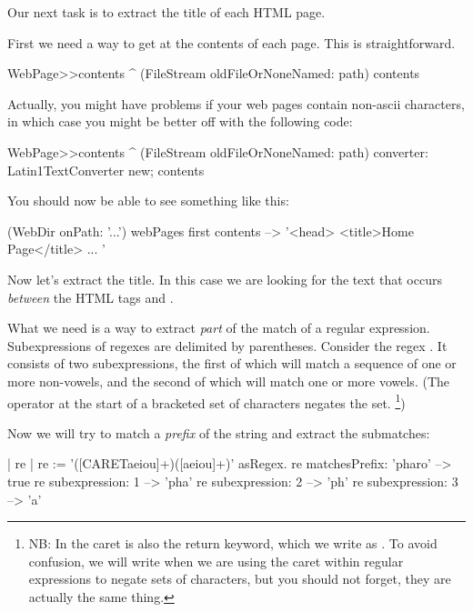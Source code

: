 \documentclass[a4paper,10pt,twoside]{book}
\begin{document}
Our next task is to extract the title of each HTML page.

First we need a way to get at the contents of each page.  This is straightforward.


\begin{code}{}
WebPage>>contents
	^ (FileStream oldFileOrNoneNamed: path) contents
\end{code}

Actually, you might have problems if your web pages contain non-ascii characters, in which case you might be better off with the following code:

\begin{code}{}
WebPage>>contents
	^ (FileStream oldFileOrNoneNamed: path)
		converter: Latin1TextConverter new;
		contents
\end{code}

You should now be able to see something like this:

\begin{code}{}
(WebDir onPath: '...') webPages first contents --> '<head>
<title>Home Page</title>
...
'
\end{code}

Now let's extract the title. In this case we are looking for the text that occurs \emph{between} the HTML tags  and . 

What we need is a way to extract \emph{part} of the match of a regular expression. Subexpressions of regexes are delimited by parentheses. Consider the regex \ct{([CARETaeiou]+)([aeiou]+)}. It consists of two subexpressions, the first of which will match a sequence of one or more non-vowels, and the second of which will match one or more vowels. (The operator  at the start of a bracketed set of characters negates the set. \footnote{NB: In \pharo the caret is also the return keyword, which we write as \ct{^}. To avoid confusion, we will write  when we are using the caret within regular expressions to negate sets of characters, but you should not forget, they are actually the same thing.}) 
  
Now we will try to match a \emph{prefix} of the string  and extract the submatches:

\begin{code}{| re |}
re := '([CARETaeiou]+)([aeiou]+)' asRegex.
re matchesPrefix: 'pharo' --> true
re subexpression: 1         --> 'pha'
re subexpression: 2         --> 'ph'
re subexpression: 3         --> 'a'
\end{code}
\end{document}

